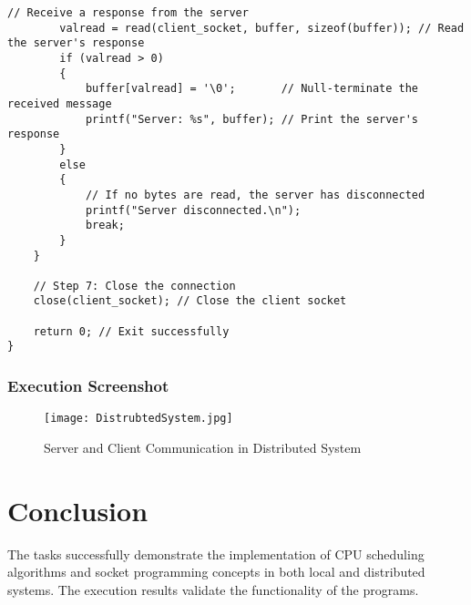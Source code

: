 \documentclass[a4paper,12pt]{article}
\begin{document}
\begin{lstlisting}[caption={Distributed System Client Code}, label={lst:distributed-client}]
        // Receive a response from the server
        valread = read(client_socket, buffer, sizeof(buffer)); // Read the server's response
        if (valread > 0)
        {
            buffer[valread] = '\0';       // Null-terminate the received message
            printf("Server: %s", buffer); // Print the server's response
        }
        else
        {
            // If no bytes are read, the server has disconnected
            printf("Server disconnected.\n");
            break;
        }
    }

    // Step 7: Close the connection
    close(client_socket); // Close the client socket

    return 0; // Exit successfully
}

\end{lstlisting}

\subsubsection{Execution Screenshot}
\begin{figure}[h!]
    \centering
    \texttt{[image: DistrubtedSystem.jpg]}
    \caption{Server and Client Communication in Distributed System}
    \label{fig:distributed-server}
\end{figure}

\section{Conclusion}
The tasks successfully demonstrate the implementation of CPU scheduling algorithms and socket programming concepts in both local and distributed systems. The execution results validate the functionality of the programs.
\end{document}
